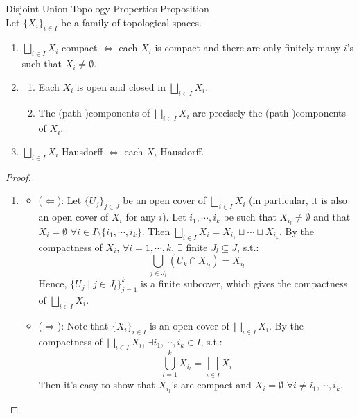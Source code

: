 \begin{proposition}{Disjoint Union Topology-Properties Proposition}\\
Let $\{X_i\}_{i \in I}$ be a family of topological spaces.
\begin{enumerate}
    \item $\bigsqcup_{ i\in I}X_i$ compact $\Leftrightarrow$ each $X_i$ is compact and there are only finitely many $i$'s such that $X_i \neq \emptyset$.
    \item \begin{enumerate}
        \item Each $X_i$ is open and closed in $\bigsqcup_{i \in I}X_i$.
        \item The (path-)components of $\bigsqcup_{i\in I}X_i$ are precisely the (path-)components of $X_i$.
    \end{enumerate}
    \item $\bigsqcup_{i \in I}X_i$ Hausdorff $\Leftrightarrow$ each $X_i$ Hausdorff.
\end{enumerate}
\end{proposition}

\begin{proof}
    \begin{enumerate}
        \item \begin{itemize}
            \item ($\Leftarrow$): Let $\{U_j\}_{j \in J}$ be an open cover of $\bigsqcup_{i \in I}X_i$ (in particular, it is also an open cover of $X_i$ for any $i$). Let $i_1,\cdots, i_k$ be such that $X_{i_l} \neq \emptyset$ and that $X_i = \emptyset$ $\forall i \in I \setminus \{i_1,\cdots, i_k\}$. Then $\bigsqcup_{i\in I}X_i = X_{i_1} \sqcup \cdots \sqcup X_{i_k}$. By the compactness of $X_i$, $\forall i=1,\cdots, k$, $\exists$ finite $J_l \subseteq J$, s.t.:
            $$\bigcup_{j \in J_l} (U_k \cap X_{i_l}) = X_{i_l}$$
            Hence, $\{ U_j \mid j \in J_l\}_{j=1}^k$ is a finite subcover, which gives the compactness of $\bigsqcup_{i \in I}X_i$.

            \item ($\Rightarrow$): Note that $\{X_i\}_{i \in I}$ is an open cover of $\bigsqcup_{i \in I}X_i$. By the compactness of $\bigsqcup_{i \in I}X_i$, $\exists i_1,\cdots, i_k \in I$, s.t.:
            $$\bigcup_{l=1}^k X_{i_l} = \bigsqcup_{i \in I} X_i$$
            Then it's easy to show that $X_{i_l}$'s are compact and $X_i=\emptyset$ $\forall i \neq i_1,\cdots,i_k$.
        \end{itemize}
    \end{enumerate}
\end{proof}

